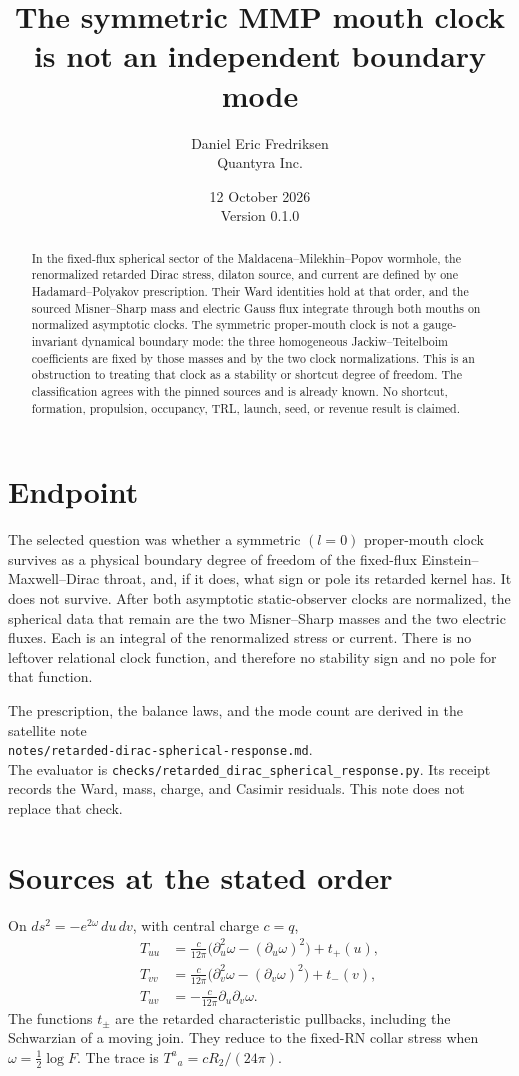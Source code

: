 \documentclass[11pt]{article}
\title{The symmetric MMP mouth clock is not an independent boundary mode}
\author{Daniel Eric Fredriksen\\Quantyra Inc.}
\date{12 October 2026\\Version 0.1.0}
\begin{document}
\maketitle

\begin{abstract}
In the fixed-flux spherical sector of the Maldacena--Milekhin--Popov wormhole, the renormalized retarded Dirac stress, dilaton source, and current are defined by one Hadamard--Polyakov prescription. Their Ward identities hold at that order, and the sourced Misner--Sharp mass and electric Gauss flux integrate through both mouths on normalized asymptotic clocks. The symmetric proper-mouth clock is not a gauge-invariant dynamical boundary mode: the three homogeneous Jackiw--Teitelboim coefficients are fixed by those masses and by the two clock normalizations. This is an obstruction to treating that clock as a stability or shortcut degree of freedom. The classification agrees with the pinned sources and is already known. No shortcut, formation, propulsion, occupancy, TRL, launch, seed, or revenue result is claimed.
\end{abstract}

\section{Endpoint}
The selected question was whether a symmetric \((l=0)\) proper-mouth clock survives as a physical boundary degree of freedom of the fixed-flux Einstein--Maxwell--Dirac throat, and, if it does, what sign or pole its retarded kernel has. It does not survive. After both asymptotic static-observer clocks are normalized, the spherical data that remain are the two Misner--Sharp masses and the two electric fluxes. Each is an integral of the renormalized stress or current. There is no leftover relational clock function, and therefore no stability sign and no pole for that function.

The prescription, the balance laws, and the mode count are derived in the satellite note\\
\texttt{notes/retarded-dirac-spherical-response.md}.\\
The evaluator is \texttt{checks/retarded\_dirac\_spherical\_response.py}.
Its receipt records the Ward, mass, charge, and Casimir residuals. This note does not replace that check.

\section{Sources at the stated order}
On \(ds^{2}=-e^{2\omega}\,du\,dv\), with central charge \(c=q\),
\begin{align}
T_{uu}&=\frac{c}{12\pi}\big(\partial_{u}^{2}\omega-(\partial_{u}\omega)^{2}\big)+t_{+}(u),\\
T_{vv}&=\frac{c}{12\pi}\big(\partial_{v}^{2}\omega-(\partial_{v}\omega)^{2}\big)+t_{-}(v),\\
T_{uv}&=-\frac{c}{12\pi}\partial_{u}\partial_{v}\omega.
\end{align}
The functions \(t_{\pm}\) are the retarded characteristic pullbacks, including the Schwarzian of a moving join. They reduce to the fixed-RN collar stress when \(\omega=\tfrac12\log F\). The trace is \(T^{a}{}_{a}=c R_{2}/(24\pi)\).
\end{document}
